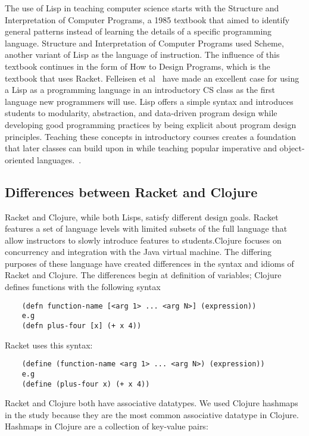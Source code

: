 \documentclass[12pt]{article}
\begin{document}
	The use of Lisp in teaching computer science starts with the Structure and Interpretation of Computer Programs, a 1985 textbook that aimed to identify general patterns instead of learning the details of a specific programming language. 
	Structure and Interpretation of Computer Programs used Scheme, another variant of Lisp as the language of instruction. The influence of this textbook continues in the form of How to Design Programs, which is the textbook that uses Racket. 
	Felleisen et al~\cite{Felleisen:2004} have made an excellent case for using a Lisp as a programming language in an introductory CS class as the first language new programmers will use.
	 Lisp offers a simple syntax and introduces students to modularity, abstraction, and data-driven program design while developing good programming practices by being explicit about program design principles.
	 Teaching these concepts in introductory courses creates a foundation that later classes can build upon in  while teaching popular imperative and object-oriented languages.~\cite{Bieniusa:2008}.
	 
	\subsection{Differences between Racket and Clojure}\label{sec:diff}
	
Racket and Clojure, while both Lisps, satisfy different design goals. 
Racket features a set of language levels with limited subsets of the full language that allow instructors to slowly introduce features to students.Clojure focuses on concurrency and integration with the Java virtual machine. 
The differing purposes of these language have created differences in the syntax and idioms of Racket and Clojure.
 The differences begin at definition of variables; Clojure defines functions with the following syntax

\begin{verbatim}
	(defn function-name [<arg 1> ... <arg N>] (expression))
	e.g
	(defn plus-four [x] (+ x 4))
\end{verbatim}
Racket uses this syntax:
\begin{verbatim}
	(define (function-name <arg 1> ... <arg N>) (expression))
	e.g
	(define (plus-four x) (+ x 4))
\end{verbatim}

Racket and Clojure both have associative datatypes.%
We used Clojure hashmaps in the study because they are the most common associative datatype in Clojure.
Hashmaps in Clojure are a collection of key-value pairs: 
\end{document}
